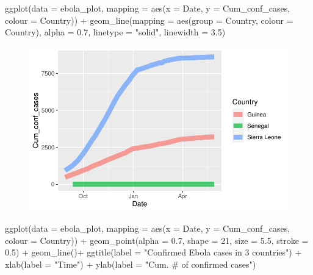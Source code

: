 \documentclass[
  letterpaper,
  DIV=11,
  numbers=noendperiod]{scrartcl}
\newenvironment{Shaded}{\begin{snugshade}}{\end{snugshade}}
\newcommand{\AttributeTok}[1]{\textcolor[rgb]{0.40,0.45,0.13}{#1}}
\newcommand{\DecValTok}[1]{\textcolor[rgb]{0.68,0.00,0.00}{#1}}
\newcommand{\FloatTok}[1]{\textcolor[rgb]{0.68,0.00,0.00}{#1}}
\newcommand{\FunctionTok}[1]{\textcolor[rgb]{0.28,0.35,0.67}{#1}}
\newcommand{\NormalTok}[1]{\textcolor[rgb]{0.00,0.23,0.31}{#1}}
\newcommand{\SpecialCharTok}[1]{\textcolor[rgb]{0.37,0.37,0.37}{#1}}
\newcommand{\StringTok}[1]{\textcolor[rgb]{0.13,0.47,0.30}{#1}}
\begin{document}
\begin{Shaded}
\begin{Highlighting}[]
  \FunctionTok{ggplot}\NormalTok{(}\AttributeTok{data =}\NormalTok{ ebola\_plot, }
         \AttributeTok{mapping =} \FunctionTok{aes}\NormalTok{(}\AttributeTok{x =}\NormalTok{ Date, }\AttributeTok{y =}\NormalTok{ Cum\_conf\_cases, }\AttributeTok{colour =}\NormalTok{ Country)) }\SpecialCharTok{+} 
    \FunctionTok{geom\_line}\NormalTok{(}\AttributeTok{mapping =} \FunctionTok{aes}\NormalTok{(}\AttributeTok{group =}\NormalTok{ Country, }\AttributeTok{colour =}\NormalTok{ Country), }
  \AttributeTok{alpha =} \FloatTok{0.7}\NormalTok{, }\AttributeTok{linetype =} \StringTok{"solid"}\NormalTok{, }\AttributeTok{linewidth =} \FloatTok{3.5}\NormalTok{)}
\end{Highlighting}
\end{Shaded}

\begin{figure}[H]

{\centering \includegraphics{Day2_script_20230606_files/figure-pdf/unnamed-chunk-2-3.pdf}

}

\end{figure}

\begin{Shaded}
\begin{Highlighting}[]
  \FunctionTok{ggplot}\NormalTok{(}\AttributeTok{data =}\NormalTok{ ebola\_plot, }
         \AttributeTok{mapping =} \FunctionTok{aes}\NormalTok{(}\AttributeTok{x =}\NormalTok{ Date, }\AttributeTok{y =}\NormalTok{ Cum\_conf\_cases, }\AttributeTok{colour =}\NormalTok{ Country)) }\SpecialCharTok{+} 
    \FunctionTok{geom\_point}\NormalTok{(}\AttributeTok{alpha =} \FloatTok{0.7}\NormalTok{, }\AttributeTok{shape =} \DecValTok{21}\NormalTok{, }\AttributeTok{size =} \FloatTok{5.5}\NormalTok{, }\AttributeTok{stroke =} \FloatTok{0.5}\NormalTok{) }\SpecialCharTok{+}
    \FunctionTok{geom\_line}\NormalTok{()}\SpecialCharTok{+}
    \FunctionTok{ggtitle}\NormalTok{(}\AttributeTok{label =} \StringTok{"Confirmed Ebola cases in 3 countries"}\NormalTok{) }\SpecialCharTok{+}
    \FunctionTok{xlab}\NormalTok{(}\AttributeTok{label =} \StringTok{"Time"}\NormalTok{) }\SpecialCharTok{+}
    \FunctionTok{ylab}\NormalTok{(}\AttributeTok{label =} \StringTok{"Cum. \# of confirmed cases"}\NormalTok{)}
\end{Highlighting}
\end{Shaded}
\end{document}
